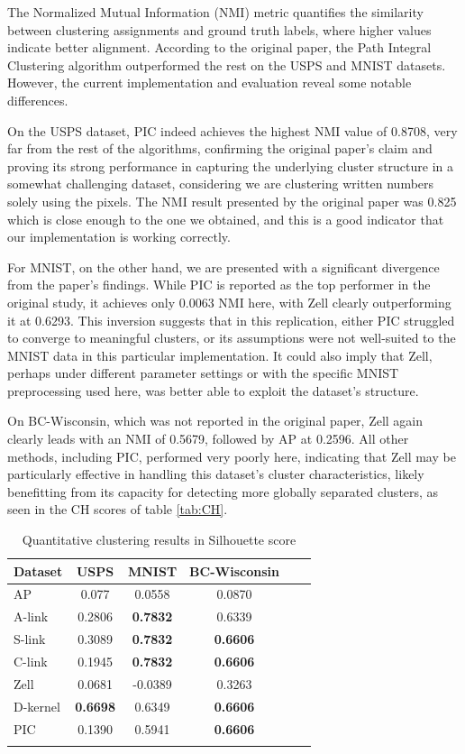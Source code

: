 \documentclass[
	10pt,
	parskip=half-,	
	paper=a4,
	english
	]{scrartcl}
\begin{document}
The Normalized Mutual Information (NMI) metric quantifies the similarity between clustering assignments and ground truth labels, where higher values indicate better alignment. According to the original paper, the Path Integral Clustering algorithm outperformed the rest on the USPS and MNIST datasets. However, the current implementation and evaluation reveal some notable differences.

On the USPS dataset, PIC indeed achieves the highest NMI value of 0.8708, very far from the rest of the algorithms, confirming the original paper's claim and proving its strong performance in capturing the underlying cluster structure in a somewhat challenging dataset, considering we are clustering written numbers solely using the pixels. The NMI result presented by the original paper was 0.825 which is close enough to the one we obtained, and this is a good indicator that our implementation is working correctly.

For MNIST, on the other hand, we are presented with a significant divergence from the paper's findings. While PIC is reported as the top performer in the original study, it achieves only 0.0063 NMI here, with Zell clearly outperforming it at 0.6293. This inversion suggests that in this replication, either PIC struggled to converge to meaningful clusters, or its assumptions were not well-suited to the MNIST data in this particular implementation. It could also imply that Zell, perhaps under different parameter settings or with the specific MNIST preprocessing used here, was better able to exploit the dataset's structure.

On BC-Wisconsin, which was not reported in the original paper, Zell again clearly leads with an NMI of 0.5679, followed by AP at 0.2596. All other methods, including PIC, performed very poorly here, indicating that Zell may be particularly effective in handling this dataset's cluster characteristics, likely benefitting from its capacity for detecting more globally separated clusters, as seen in the CH scores of table \ref{tab:CH}.

\begin{table}[h]
    \centering
    \caption{Quantitative clustering results in Silhouette score}
    \begin{tabular}{lccccc}
    \toprule
    \textbf{Dataset} & \textbf{USPS} & \textbf{MNIST} & \textbf{BC-Wisconsin} \\
    \midrule
    AP       & 0.077   & 0.0558 & 0.0870 \\
    A-link   & 0.2806  & \textbf{0.7832} & 0.6339  \\
    S-link   & 0.3089   & \textbf{0.7832} & \textbf{0.6606} \\
    C-link   & 0.1945   & \textbf{0.7832} & \textbf{0.6606} \\
    Zell     & 0.0681   & -0.0389 & 0.3263 \\
    D-kernel & \textbf{0.6698}   & 0.6349 & \textbf{0.6606} \\
    PIC      & 0.1390  & 0.5941 & \textbf{0.6606} \\
    \bottomrule
    \label{tab:Silhouette}
    \end{tabular}
\end{table}
\end{document}
